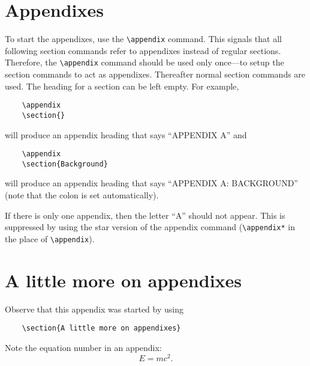 \documentclass[%
 reprint,
 amsmath,amssymb,
 aps,
]{revtex4-2}
\begin{document}
    \section{Appendixes}
    
    To start the appendixes, use the \verb+\appendix+ command.
    This signals that all following section commands refer to appendixes
    instead of regular sections. Therefore, the \verb+\appendix+ command
    should be used only once---to setup the section commands to act as
    appendixes. Thereafter normal section commands are used. The heading
    for a section can be left empty. For example,
    \begin{verbatim}
    \appendix
    \section{}
    \end{verbatim}
    will produce an appendix heading that says ``APPENDIX A'' and
    \begin{verbatim}
    \appendix
    \section{Background}
    \end{verbatim}
    will produce an appendix heading that says ``APPENDIX A: BACKGROUND''
    (note that the colon is set automatically).
    
    If there is only one appendix, then the letter ``A'' should not
    appear. This is suppressed by using the star version of the appendix
    command (\verb+\appendix*+ in the place of \verb+\appendix+).
    
    \section{A little more on appendixes}
    
    Observe that this appendix was started by using
    \begin{verbatim}
    \section{A little more on appendixes}
    \end{verbatim}
    
    Note the equation number in an appendix:
    \begin{equation}
    E=mc^2.
    \end{equation}
    
\end{document}
